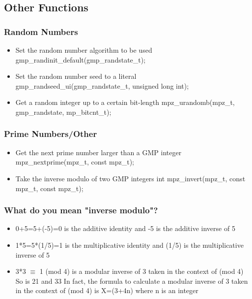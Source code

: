 
\subsection{Other Functions}

\begin{frame}
\frametitle{Random Numbers}
  \begin{itemize}
    \item Set the random number algorithm to be used\break
    gmp\_randinit\_default(gmp\_randstate\_t);
    \item Set the random number seed to a literal\break
    gmp\_randseed\_ui(gmp\_randstate\_t, unsigned long int);
    \item Get a random integer up to a certain bit-length\break
    mpz\_urandomb(mpz\_t, gmp\_randstate, mp\_bitcnt\_t);
  \end{itemize}
\end{frame}

\begin{frame}
\frametitle{Prime Numbers/Other}
  \begin{itemize}
    \item Get the next prime number larger than a GMP integer\break
    mpz\_nextprime(mpz\_t, const mpz\_t);
    \item Take the inverse modulo of two GMP integers\break
    int mpz\_invert(mpz\_t, const mpz\_t, const mpz\_t);
  \end{itemize}
\end{frame}

\begin{frame}
\frametitle{What do you mean "inverse modulo"?}
  \begin{itemize}
    \item 0+5=5+(-5)=0 is the additive identity and -5 is the additive inverse of 5
    \item 1*5=5*(1/5)=1 is the multiplicative identity and (1/5) is the multiplicative inverse of 5
    \item 3*3 $\equiv$ 1 (mod 4) is a modular inverse of 3 taken in the context of (mod 4)\break
    So is 21 and 33\break
    In fact, the formula to calculate a modular inverse of 3 taken
    in the context of (mod 4) is X=(3+4n) where n is an integer
  \end{itemize}
\end{frame}
